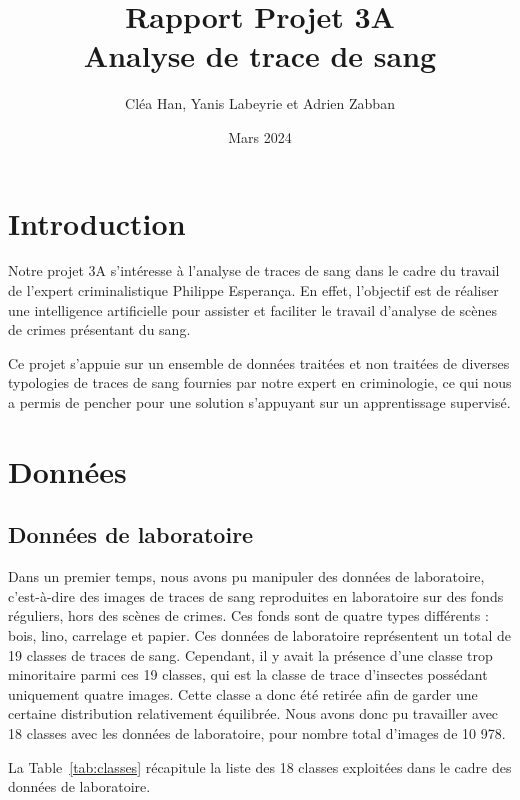 \documentclass[a4paper]{article}
\title{Rapport Projet 3A \\ Analyse de trace de sang}
\author{Cléa Han, Yanis Labeyrie et Adrien Zabban}
\date{Mars 2024}
\begin{document}
\maketitle

\section{Introduction}

Notre projet 3A s'intéresse à l'analyse de traces de sang dans le cadre du travail de l'expert criminalistique Philippe Esperança. En effet, l'objectif est de réaliser une intelligence artificielle pour assister et faciliter le travail d'analyse de scènes de crimes présentant du sang. 

Ce projet s'appuie sur un ensemble de données traitées et non traitées de diverses typologies de traces de sang fournies par notre expert en criminologie, ce qui nous a permis de pencher pour une solution s'appuyant sur un apprentissage supervisé. 

\section{Données}

\subsection{Données de laboratoire}
Dans un premier temps, nous avons pu manipuler des données de laboratoire, c'est-à-dire des images de traces de sang reproduites en laboratoire sur des fonds réguliers, hors des scènes de crimes. Ces fonds sont de quatre types différents : bois, lino, carrelage et papier.
Ces données de laboratoire représentent un total de 19 classes de traces de sang. Cependant, il y avait la présence d'une classe trop minoritaire parmi ces 19 classes, qui est la classe de trace d'insectes possédant uniquement quatre images. Cette classe a donc été retirée afin de garder une certaine distribution relativement équilibrée. Nous avons donc pu travailler avec 18 classes avec les données de laboratoire, pour nombre total d'images de 10 978.

La Table~\ref{tab:classes} récapitule la liste des 18 classes exploitées dans le cadre des données de laboratoire. 
\end{document}

